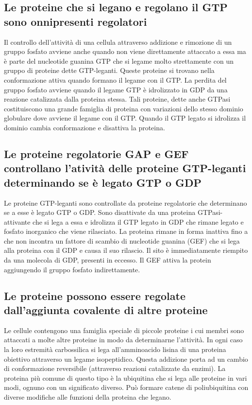 \subsection{Le proteine che si legano e regolano il GTP sono onnipresenti regolatori}
Il controllo dell'attivit\`a di una cellula attraverso addizione e rimozione di un gruppo fosfato avviene anche quando non viene direttamente attaccato a essa ma \`e parte del nucleotide
guanina GTP che si legame molto strettamente con un gruppo di proteine dette GTP-leganti. Queste proteine si trovano nella conformazione attiva quando formano il legame con il GTP. La
perdita del gruppo fosfato avviene quando il legame GTP \`e idrolizzato in GDP da una reazione catalizzata dalla proteina stessa. Tali proteine, dette anche GTPasi costituiscono una 
grande famiglia di proteina con variazioni dello stesso dominio globulare dove avviene il legame con il GTP. Quando il GTP legato si idrolizza il dominio cambia conformazione e disattiva
la proteina.
\subsection{Le proteine regolatorie GAP e GEF controllano l'ativit\`a delle proteine GTP-leganti determinando se \`e legato GTP o GDP}
Le proteine GTP-leganti sono controllate da proteine regolatorie che determinano se a esse \`e legato GTP o GDP. Sono disattivate da una proteina GTPasi-attivante che si lega a essa e 
idrolizza il GTP legato in GDP che rimane legato e fosfato inorganico che viene rilasciato. La proteina rimane in forma inattiva fino a che non incontra un fattore di scambio di 
nucleotide guanina (GEF) che si lega alla proteina con il GDP e causa il suo rilascio. Il sito \`e immediatamente riempito da una molecola di GDP, presenti in eccesso. Il GEF attiva la
protein aggiungendo il gruppo fosfato indirettamente. 
\subsection{Le proteine possono essere regolate dall'aggiunta covalente di altre proteine}
Le cellule contengono una famiglia speciale di piccole proteine i cui membri sono attaccati a molte altre proteine in modo da determinarne l'attivit\`a. In ogni caso la loro estremit\`a
carbossilica si lega all'amminoacido lisina di una proteina obiettivo attraverso un legame isopeptidico. Questa addizione porta ad un cambio di conformazione reversibile (attraverso
reazioni catalizzate da enzimi). La proteina pi\`u comune di questo tipo \`e la ubiquitina che si lega alle proteine in vari modi, ognuno con un significato diverso. Pu\`o formare
catene di poliubiquitina con diverse modifiche alle funzioni della proteina che legano.
